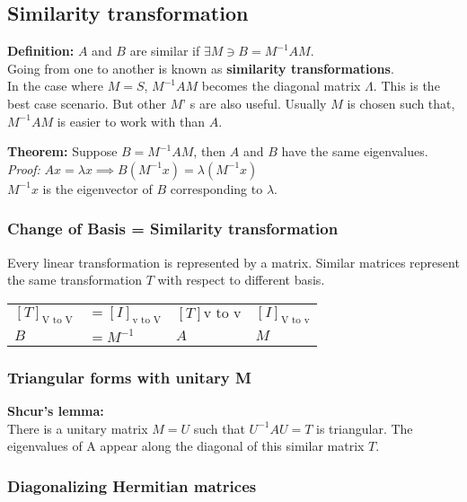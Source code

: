 \subsection{Similarity transformation}
\textbf{Definition:} $A$ and $B$ are similar if $\exists M \ni B= M^{-1}AM$.\\
Going from one to another is known as \textbf{similarity transformations}.\\

\vspace{6pt}
In the case where $M = S$, $M^{-1}AM$ becomes the diagonal matrix $\Lambda$. This is the best case scenario. But other $M$'
s are also useful. Usually $M$ is chosen such that, $M^{-1}AM$ is easier to work with than $A$.
\vspace{6pt}

\textbf{Theorem:} Suppose $B = M^{-1}AM$, then $A$ and $B$ have the same eigenvalues.\\
\textit{Proof:} $Ax = \lambda x \implies B(M^{-1}x) = \lambda (M^{-1}x)$\\
$M^{-1}x$ is the eigenvector of $B$ corresponding to $\lambda$.
\vspace{6pt}

\subsubsection{Change of Basis = Similarity transformation}

Every linear transformation is represented by a matrix. Similar matrices represent the same transformation $T$ with respect to different basis.\\
\begin{tabularx}{\linewidth}{lllX}
$[T]_{\text{V to V}}$ 	& $= [I]_{\text{v to V}}$ & $[T]{\text{v to v}}$ & $[I]_{\text{V to v}}$\\
$B$ & $=M^{-1}$ & $A$ & $M$
\end{tabularx}

\subsubsection{Triangular forms with unitary M}

\textbf{Shcur's lemma:}\\
There is a unitary matrix $M = U$ such that $U^{-1}AU = T$ is triangular. The eigenvalues of A appear along the diagonal of this similar matrix $T$.


\subsubsection{Diagonalizing Hermitian matrices}

